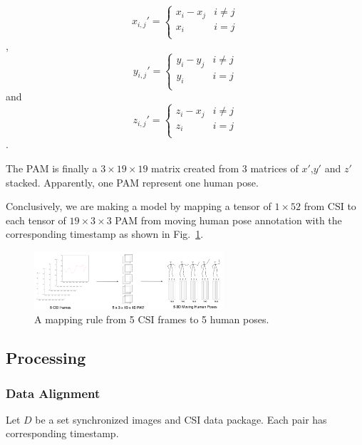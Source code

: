 \documentclass[conference]{IEEEtran}
\begin{document}
	\begin{equation}
	x_{i,j}' = \begin{cases}
	x_i-x_j &\text{$i\neq j$}\\
	x_i &\text{$i=j$}\\
	\end{cases}
	\label{eq:xPAM}
	\end{equation},
	\begin{equation}
	y_{i,j}' = \begin{cases}
	y_i-y_j &\text{$i\neq j$}\\
	y_i &\text{$i=j$}\\
	\end{cases}
	\label{eq:yPAM}
	\end{equation}
	and
	\begin{equation}
	z_{i,j}' = \begin{cases}
	z_i-x_j &\text{$i\neq j$}\\
	z_i &\text{$i=j$}\\
	\end{cases}
	\label{eq:zPAM}
	\end{equation}.
	
	The PAM is finally a $3\times19\times19$ matrix created from 3 matrices of $x'$,$y'$ and $z'$ stacked.
	Apparently, one PAM represent one human pose.
	

	
	Conclusively, we are making a model by mapping a tensor of $1\times52$ from CSI to each tensor of $ 19 \times 3 \times 3 $ PAM from moving human pose annotation with the corresponding timestamp as shown in Fig.~\ref{fig:STEP01}. 
	
	\begin{figure}[htbp]
		\centerline{\includegraphics[width=70mm,scale=0.5]{STEP01.png}}
		\caption{A mapping rule from 5 CSI frames to 5 human poses.}
		\label{fig:STEP01}
	\end{figure}
	
	
	
	\subsection{Processing}

	
	\subsubsection{Data Alignment}
	Let $D$ be a set synchronized images and CSI data package. Each pair has corresponding timestamp.
	
\end{document}
